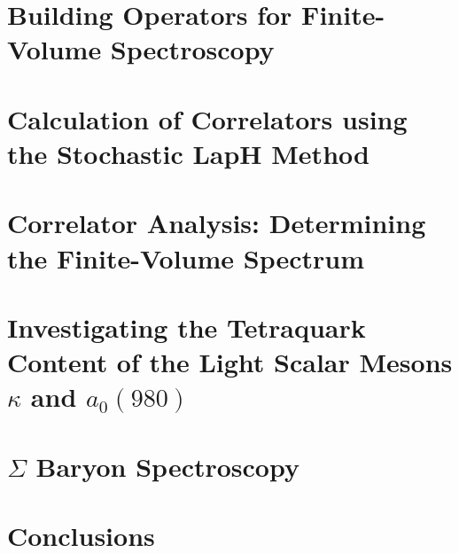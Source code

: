 \documentclass[12pt]{report}
\begin{document}
\chapter{Building Operators for Finite-Volume Spectroscopy}\label{ch:operators}


\chapter{Calculation of Correlators using the Stochastic LapH Method}\label{ch:montecarlo}


\chapter{Correlator Analysis: Determining the Finite-Volume Spectrum}\label{ch:analysis}


% 

\chapter{Investigating the Tetraquark Content of the Light Scalar Mesons $\kappa$ and $a_0(980)$}\label{ch:tetraquarks}


\chapter{$\Sigma$ Baryon Spectroscopy}\label{ch:sigmas}


\chapter{Conclusions}\label{ch:conclusions}




\end{document}
